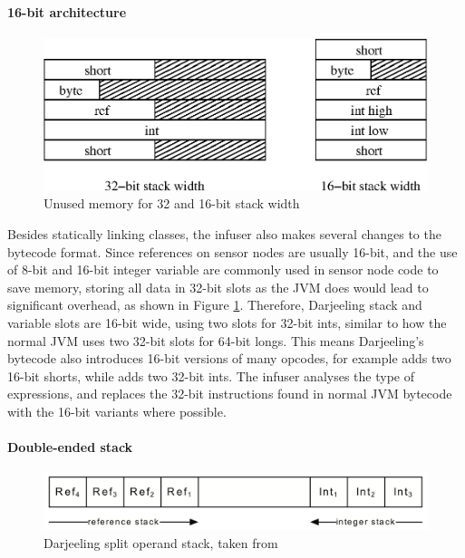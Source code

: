 \paragraph{16-bit architecture}
\begin{figure}[H]
	\centering
	\includegraphics[width=0.6\linewidth]{32bit-vs-16bit-stack}
	\caption{Unused memory for 32 and 16-bit stack width}
	\label{fig-32bit-vs-16bit-stack}
\end{figure}

Besides statically linking classes, the infuser also makes several changes to the bytecode format. Since references on sensor nodes are usually 16-bit, and the use of 8-bit and 16-bit integer variable are commonly used in sensor node code to save memory, storing all data in 32-bit slots as the JVM does would lead to significant overhead, as shown in Figure \ref{fig-32bit-vs-16bit-stack}. Therefore, Darjeeling stack and variable slots are 16-bit wide, using two slots for 32-bit ints, similar to how the normal JVM uses two 32-bit slots for 64-bit longs. This means Darjeeling's bytecode also introduces 16-bit versions of many opcodes, for example  adds two 16-bit shorts, while  adds two 32-bit ints. The infuser analyses the type of expressions, and replaces the 32-bit instructions found in normal JVM bytecode with the 16-bit variants where possible.



\paragraph{Double-ended stack}
\begin{figure}[H]
	\centering
	\includegraphics[width=0.6\linewidth]{darjeeling-split-stack}
	\caption{Darjeeling split operand stack, taken from \cite{Brouwers:2009cj}}
	\label{fig-darjeeling-split-stack}
\end{figure}

